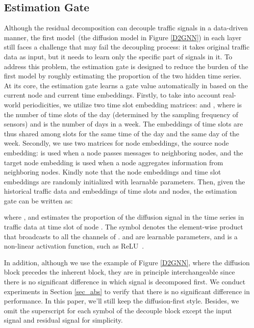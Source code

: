 \documentclass[sigconf, nonacm]{acmart}
\begin{document}
\subsection{Estimation Gate}
\label{sec_est}
Although the residual decomposition can decouple {\color{black}traffic} signals in a data-driven {\color{black}manner}, the {\color{black}first} model~({\color{black}the diffusion model in Figure \ref{D2GNN}}) in each layer still faces a challenge {\color{black}that may fail the decoupling process}: it takes original traffic data as input, but it needs to learn only the {\color{black}specific part of} signals in it.
To address this problem, the {\color{black} estimation} gate is designed to reduce the burden of the first model by roughly estimating the proportion of the {\color{black}two hidden time series}.
At its core, the {\color{black}estimation gate learns a gate value automatically} in  based on the current node and current time {\color{black}embeddings}.
{\color{black}Firstly,} to take into account real-world periodicities, we utilize two time slot embedding matrices:  and , where  is the number of time slots of the day {\color{black}(determined by the sampling frequency of sensors)} and  is the number of days in a week. The embeddings of time slots are thus shared among slots for the same time of the day and the same day of the week.
{\color{black} Secondly}, we use two matrices for node embeddings, the source node embedding:  is used when a node passes messages to neighboring nodes, and the target node embedding  is used when a node aggregates information from neighboring nodes.
{\color{black}Kindly note that the node embeddings and time slot embeddings are randomly initialized with learnable parameters.}
Then, given {\color{black}the} historical traffic data {\color{black} and embeddings of time slots and nodes}, the {\color{black}estimation} gate can be written as:

{\color{black}where} , and   estimates the proportion of {\color{black}the diffusion signal in the time series in traffic data} at time slot  of node . 
The symbol {\color{black}  denotes the element-wise product that broadcasts to all the channels of .}
 and  are learnable parameters, and  is a non-linear activation function, such as ReLU~\cite{ReLU}.

{\color{black} In addition, although we use the example of Figure \ref{D2GNN}, where the diffusion block precedes the inherent block, they are in principle interchangeable since there is no significant difference in which signal is decomposed first.
We conduct experiments in Section \ref{sec_abs} to verify that there is no significant difference in performance.
In this paper, we'll still keep the diffusion-first style.
Besides, we omit the superscript  for each symbol of the decouple block except the input signal  and residual signal  for simplicity.
}
\end{document}
